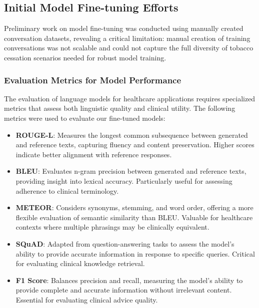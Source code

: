 \subsection{Initial Model Fine-tuning Efforts}

Preliminary work on model fine-tuning was conducted using manually created conversation datasets, revealing a critical limitation: manual creation of training conversations was not scalable and could not capture the full diversity of tobacco cessation scenarios needed for robust model training.

\subsubsection{Evaluation Metrics for Model Performance}

\begin{tcolorbox}[colback=gray!5!white,colframe=gray!75!black,title=Key Performance Metrics for Language Models]
The evaluation of language models for healthcare applications requires specialized metrics that assess both linguistic quality and clinical utility. The following metrics were used to evaluate our fine-tuned models:
\end{tcolorbox}

\begin{itemize}[label=$\bullet$, leftmargin=1cm, itemsep=0.2cm]
\item \textbf{ROUGE-L}: Measures the longest common subsequence between generated and reference texts, capturing fluency and content preservation. Higher scores indicate better alignment with reference responses.

\item \textbf{BLEU}: Evaluates n-gram precision between generated and reference texts, providing insight into lexical accuracy. Particularly useful for assessing adherence to clinical terminology.

\item \textbf{METEOR}: Considers synonyms, stemming, and word order, offering a more flexible evaluation of semantic similarity than BLEU. Valuable for healthcare contexts where multiple phrasings may be clinically equivalent.

\item \textbf{SQuAD}: Adapted from question-answering tasks to assess the model's ability to provide accurate information in response to specific queries. Critical for evaluating clinical knowledge retrieval.

\item \textbf{F1 Score}: Balances precision and recall, measuring the model's ability to provide complete and accurate information without irrelevant content. Essential for evaluating clinical advice quality.
\end{itemize}

